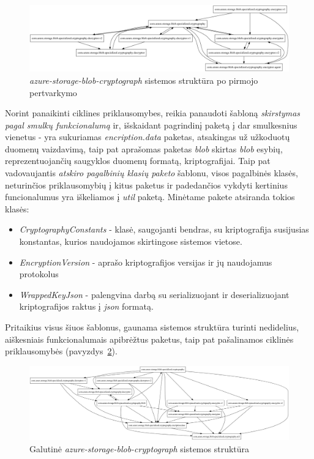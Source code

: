 \begin{figure}[H]
    \centering
    \includegraphics[scale=0.3]{img/azure_packages_v1}
    \caption{\textit{azure-storage-blob-cryptograph} sistemos struktūra po pirmojo pertvarkymo}
    \label{fig:azure_packages_v1}
\end{figure}
Norint panaikinti ciklines priklausomybes, reikia panaudoti šabloną \textit{skirstymas pagal smulkų funkcionalumą} ir, išskaidant pagrindinį paketą
į dar smulkesnius vienetus - yra sukuriamas \textit{encription.data} paketas, atsakingas už užkoduotų duomenų vaizdavimą, taip pat
aprašomas paketas \textit{blob} skirtas \textit{blob} esybių, reprezentuojančių saugyklos duomenų formatą, kriptografijai.
Taip pat vadovaujantis \textit{atskiro pagalbinių klasių paketo} šablonu, visos pagalbinės klasės, neturinčios priklausomybių į kitus paketus ir
padedančios vykdyti kertinius funcionalumus yra iškeliamos į \textit{util} paketą.
Minėtame pakete atsiranda tokios klasės:
\begin{itemize}
    \item \textit{CryptographyConstants} - klasė, saugojanti bendras, su kriptografija susijusias konstantas, kurios naudojamos skirtingose sistemos vietose.
    \item \textit{EncryptionVersion} - aprašo kriptografijos versijas ir jų naudojamus protokolus
    \item \textit{WrappedKeyJson} - palengvina darbą su serializuojant ir deserializuojant kriptografijos raktus į \textit{json} formatą.
\end{itemize}

Pritaikius visus šiuos šablonus, gaunama sistemos struktūra turinti nedidelius, aiškesniais funkcionalumais apibrėžtus paketus,
taip pat pašalinamos ciklinės priklausomybės (pavyzdys~\ref{fig:azure_packages_v2}).
\begin{figure}[H]
    \centering
    \includegraphics[scale=0.3]{img/azure_packages_v2}
    \caption{Galutinė \textit{azure-storage-blob-cryptograph} sistemos struktūra}
    \label{fig:azure_packages_v2}
\end{figure}

